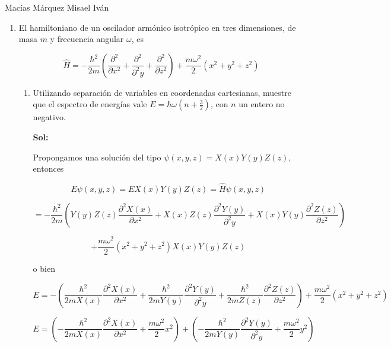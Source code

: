 \documentclass[12pt,a4paper]{article}
\begin{document}
Macías Márquez Misael Iván

\begin{enumerate}




\item El hamiltoniano de un oscilador armónico isotrópico en tres dimensiones, de masa $m$ y frecuencia angular $\omega$, es

\begin{equation*}
    \hat{H} = - \frac{\hbar^2}{2m} \left(\frac{\partial^2}{\partial x^2} + \frac{\partial^2}{\partial^2 y} + \frac{\partial^2}{\partial z^2}\right) + \frac{m \omega^2}{2} (x^2 + y^2 + z^2)
\end{equation*}

\begin{enumerate}
    \item Utilizando separación de variables en coordenadas cartesianas, muestre que el espectro de energías vale $E = \hbar \omega (n + \frac{3}{2})$, con $n$ un entero  no negativo.
    
    \textbf{Sol:}
    
    Propongamos una solución del tipo $\psi (x,y,z) =  X(x) Y(y) Z(z)$, entonces
    
    \begin{equation*}
        E\psi (x,y,z)= E X(x) Y(y) Z(z) = \hat{H} \psi (x,y,z) 
    \end{equation*}
    
    \begin{equation*}
        = - \frac{\hbar^2}{2m} \left(Y(y) Z(z)\frac{\partial^2 X(x)}{\partial x^2} +X(x) Z(z) \frac{\partial^2 Y(y)}{\partial^2 y} +X(x)Y(y) \frac{\partial^2 Z(z)}{\partial z^2}\right) 
    \end{equation*}
    
    \begin{equation*}
        + \frac{m \omega^2}{2} (x^2 + y^2 + z^2) X(x) Y(y) Z(z)
    \end{equation*}
    
    o bien
    
    \begin{equation*}
        E = -  \left(\frac{\hbar^2}{2m X(x)}\frac{\partial^2 X(x)}{\partial x^2} +\frac{\hbar^2}{2m Y(y)} \frac{\partial^2 Y(y)}{\partial^2 y} +\frac{\hbar^2}{2m Z(z)} \frac{\partial^2 Z(z)}{\partial z^2}\right) + \frac{m \omega^2}{2} (x^2 + y^2 + z^2)
    \end{equation*}
    
    \begin{equation*}
        E =   \left(-\frac{\hbar^2}{2m X(x)}\frac{\partial^2 X(x)}{\partial x^2}+ \frac{m \omega^2}{2}  x^2\right) +\left(-\frac{\hbar^2}{2m Y(y)} \frac{\partial^2 Y(y)}{\partial^2 y}+ \frac{m \omega^2}{2} y^2\right)
    \end{equation*}
    

\end{enumerate}
\end{enumerate}
\end{document}
